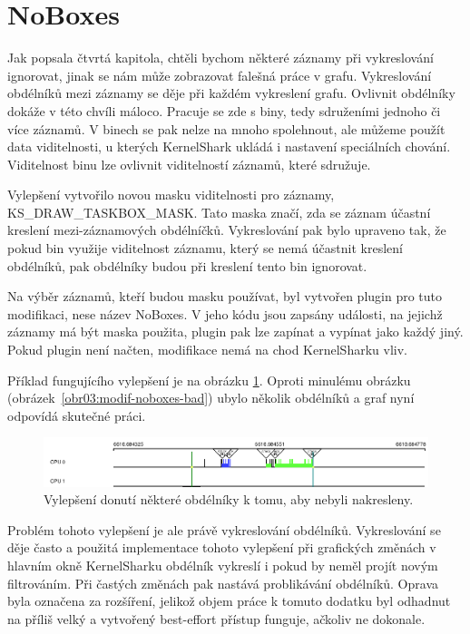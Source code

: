 \section{NoBoxes}

Jak popsala čtvrtá kapitola, chtěli bychom některé záznamy při vykreslování ignorovat, jinak se nám může zobrazovat falešná práce v grafu. Vykreslování obdélníků mezi záznamy se děje při každém vykreslení grafu. Ovlivnit obdélníky dokáže v této chvíli máloco. Pracuje se zde s biny, tedy sdruženími jednoho či více záznamů. V binech se pak nelze na mnoho spolehnout, ale můžeme použít data viditelnosti, u kterých KernelShark ukládá i nastavení speciálních chování. Viditelnost binu lze ovlivnit viditelností záznamů, které sdružuje.

Vylepšení vytvořilo novou masku viditelnosti pro záznamy, KS\_DRAW\_TASKBOX\_MASK. Tato maska značí, zda se záznam účastní kreslení mezi-záznamových obdélníčků. Vykreslování pak bylo upraveno tak, že pokud bin využije viditelnost záznamu, který se nemá účastnit kreslení obdélníků, pak obdélníky budou při kreslení tento bin ignorovat.

Na výběr záznamů, kteří budou masku používat, byl vytvořen plugin pro tuto modifikaci, nese název NoBoxes. V jeho kódu jsou zapsány události, na jejichž záznamy má být maska použita, plugin pak lze zapínat a vypínat jako každý jiný. Pokud plugin není načten, modifikace nemá na chod KernelSharku vliv.

Příklad fungujícího vylepšení je na obrázku \ref{obr04:modif-noboxes-good}. Oproti minulému obrázku (obrázek~\ref{obr03:modif-noboxes-bad}) ubylo několik obdélníků a graf nyní odpovídá skutečné práci.

\begin{figure}[p]\centering
    \includegraphics[width=140mm]{img/Modifikace/modif-noboxes-good}
    \caption{Vylepšení donutí některé obdélníky k tomu, aby nebyli nakresleny.}
    \label{obr04:modif-noboxes-good}
\end{figure}

Problém tohoto vylepšení je ale právě vykreslování obdélníků. Vykreslování se děje často a použitá implementace tohoto vylepšení při grafických změnách v hlavním okně KernelSharku obdélník vykreslí i pokud by neměl projít novým filtrováním. Při častých změnách pak nastává problikávání obdélníků. Oprava byla označena za rozšíření, jelikož objem práce k tomuto dodatku byl odhadnut na příliš velký a vytvořený best-effort přístup funguje, ačkoliv ne dokonale.